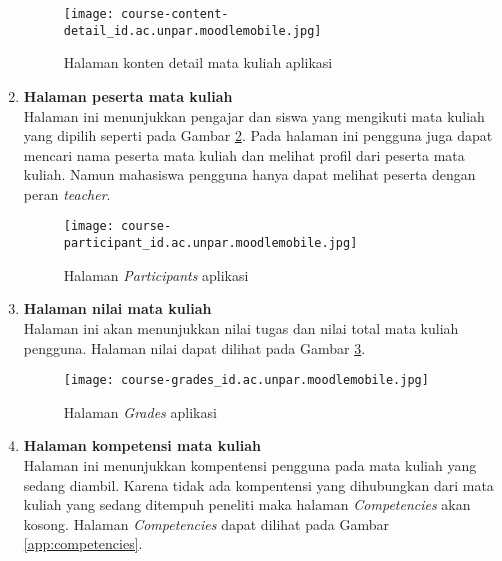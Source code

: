 \begin{enumerate}
\begin{figure}[H] 
	\centering  
	\texttt{[image: course-content-detail\_id.ac.unpar.moodlemobile.jpg]}  
	\caption[Halaman konten detail mata kuliah aplikasi] {Halaman konten detail mata kuliah aplikasi} 
	\label{app:content:detail} 
\end{figure}  

\item \textbf{Halaman peserta mata kuliah} \\
Halaman ini menunjukkan pengajar dan siswa yang mengikuti mata kuliah yang dipilih seperti pada Gambar \ref{app:participants}. Pada halaman ini pengguna juga dapat mencari nama peserta mata kuliah dan melihat profil dari peserta mata kuliah. Namun mahasiswa pengguna hanya dapat melihat peserta dengan peran \textit{teacher}. 

\begin{figure}[H] 
	\centering  
	\texttt{[image: course-participant\_id.ac.unpar.moodlemobile.jpg]}  
	\caption[Halaman \textit{Participants} aplikasi] {Halaman \textit{Participants} aplikasi} 
	\label{app:participants} 
\end{figure}  

\item \textbf{Halaman nilai mata kuliah} \\
Halaman ini akan menunjukkan nilai tugas dan nilai total mata kuliah pengguna. Halaman nilai dapat dilihat pada Gambar \ref{app:grades}.

\begin{figure}[H] 
	\centering  
	\texttt{[image: course-grades\_id.ac.unpar.moodlemobile.jpg]}  
	\caption[Halaman \textit{Grades} aplikasi] {Halaman \textit{Grades} aplikasi} 
	\label{app:grades} 
\end{figure}  


\item \textbf{Halaman kompetensi mata kuliah} \\
Halaman ini menunjukkan kompentensi pengguna pada mata kuliah yang sedang diambil. Karena tidak ada kompentensi yang dihubungkan dari mata kuliah yang sedang ditempuh peneliti maka halaman \textit{Competencies} akan kosong. Halaman \textit{Competencies} dapat dilihat pada Gambar \ref{app:competencies}.


\end{enumerate}
